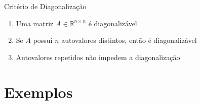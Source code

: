 \documentclass[fleqn,aspectratio=169,12pt]{beamer}
\begin{document}
\begin{frame}{Critério de Diagonalização}
\begin{enumerate}[<+->]
  \setlength{\itemsep}{2em}

  \item Uma matriz \(A\in\mathbb{R}^{n\times n}\) é diagonalizável
        \\ \medskip

  \item Se \(A\) possui \(n\) autovalores distintos, então é diagonalizável

  \item Autovalores repetidos não impedem a diagonalização
\end{enumerate}
\end{frame}

\section{Exemplos}





%
%

\end{document}
